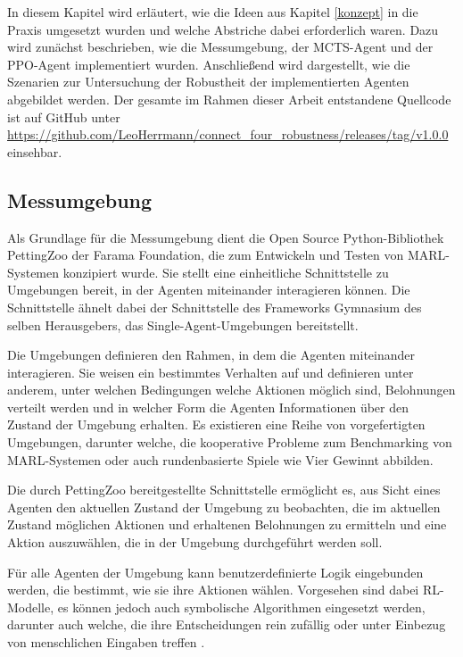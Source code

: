 In diesem Kapitel wird erläutert, wie die Ideen aus Kapitel \ref{konzept} in die Praxis umgesetzt wurden und welche Abstriche dabei erforderlich waren. Dazu wird zunächst beschrieben, wie die Messumgebung, der MCTS-Agent und der PPO-Agent implementiert wurden. Anschließend wird dargestellt, wie die Szenarien zur Untersuchung der Robustheit der implementierten Agenten abgebildet werden. Der gesamte im Rahmen dieser Arbeit entstandene Quellcode ist auf GitHub unter \url{https://github.com/LeoHerrmann/connect_four_robustness/releases/tag/v1.0.0} einsehbar.

\subsection{Messumgebung}

\label{messumgebung}


Als Grundlage für die Messumgebung dient die Open Source Python-Bibliothek PettingZoo der Farama Foundation, die zum Entwickeln und Testen von MARL-Systemen konzipiert wurde. Sie stellt eine einheitliche Schnittstelle zu Umgebungen bereit, in der Agenten miteinander interagieren können. Die Schnittstelle ähnelt dabei der Schnittstelle des Frameworks Gymnasium des selben Herausgebers, das Single-Agent-Umgebungen bereitstellt.

Die Umgebungen definieren den Rahmen, in dem die Agenten miteinander interagieren. Sie weisen ein bestimmtes Verhalten auf und definieren unter anderem, unter welchen Bedingungen welche Aktionen möglich sind, Belohnungen verteilt werden und in welcher Form die Agenten Informationen über den Zustand der Umgebung erhalten. Es existieren eine Reihe von vorgefertigten Umgebungen, darunter welche, die kooperative Probleme zum Benchmarking von MARL-Systemen oder auch rundenbasierte Spiele wie Vier Gewinnt abbilden.

Die durch PettingZoo bereitgestellte Schnittstelle ermöglicht es, aus Sicht eines Agenten den aktuellen Zustand der Umgebung zu beobachten, die im aktuellen Zustand möglichen Aktionen und erhaltenen Belohnungen zu ermitteln und eine Aktion auszuwählen, die in der Umgebung durchgeführt werden soll.

Für alle Agenten der Umgebung kann benutzerdefinierte Logik eingebunden werden, die bestimmt, wie sie ihre Aktionen wählen. Vorgesehen sind dabei RL-Modelle, es können jedoch auch symbolische Algorithmen eingesetzt werden, darunter auch welche, die ihre Entscheidungen rein zufällig oder unter Einbezug von menschlichen Eingaben treffen \cite{Farama.2025}.

